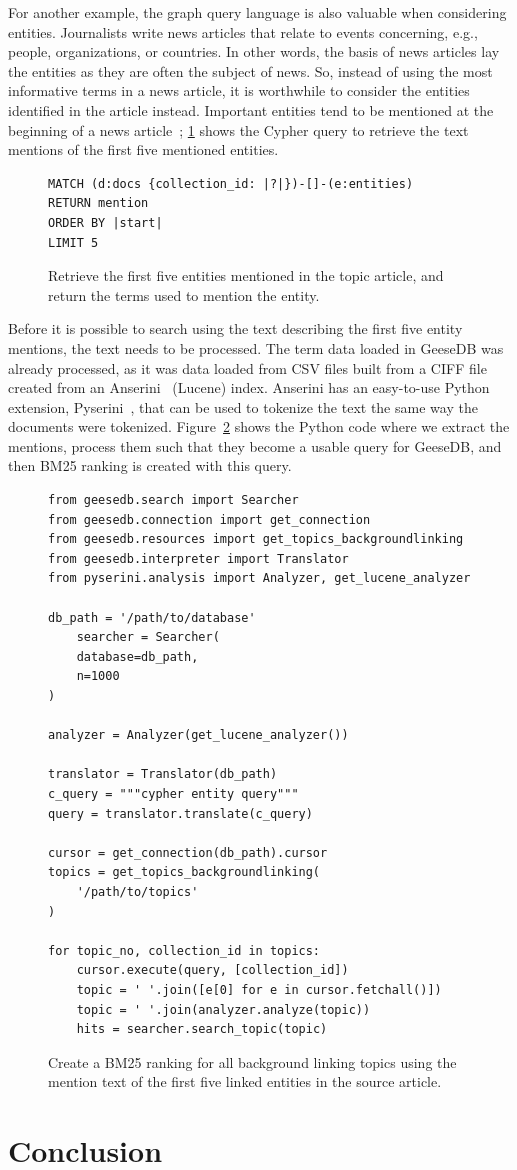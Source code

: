 For another example, the graph query language is also valuable when considering entities. Journalists write news articles that relate to events concerning, e.g., people, organizations, or countries. In other words, the basis of news articles lay the entities as they are often the subject of news. So, instead of using the most informative terms in a news article, it is worthwhile to consider the entities identified in the article instead. Important entities tend to be mentioned at the beginning of a news article~\cite{entities-loc}; \cref{fig:entity-cypher} shows the Cypher query to retrieve the text mentions of the first five mentioned entities.

\begin{figure}
	\begin{verbatim}
MATCH (d:docs {collection_id: |?|})-[]-(e:entities)
RETURN mention
ORDER BY |start|
LIMIT 5
	\end{verbatim}
	\caption{Retrieve the first five entities mentioned in the topic article, and return the terms used to mention the entity.}
	\label{fig:entity-cypher}
\end{figure}
\noindent Before it is possible to search using the text describing the first five entity mentions, the text needs to be processed. The term data loaded in GeeseDB was already processed, as it was data loaded from CSV files built from a CIFF file created from an Anserini~\cite{anserini} (Lucene) index. Anserini has an easy-to-use Python extension, Pyserini~\cite{pyserini}, that can be used to tokenize the text the same way the documents were tokenized. Figure~\ref{fig:entities-code} shows the Python code where we extract the mentions, process them such that they become a usable query for GeeseDB, and then BM25 ranking is created with this query.

\begin{figure}
	\begin{verbatim}
from geesedb.search import Searcher
from geesedb.connection import get_connection
from geesedb.resources import get_topics_backgroundlinking
from geesedb.interpreter import Translator
from pyserini.analysis import Analyzer, get_lucene_analyzer

db_path = '/path/to/database'
    searcher = Searcher(
    database=db_path,
    n=1000
)

analyzer = Analyzer(get_lucene_analyzer())

translator = Translator(db_path)
c_query = """cypher entity query"""
query = translator.translate(c_query)

cursor = get_connection(db_path).cursor
topics = get_topics_backgroundlinking(
    '/path/to/topics'
)

for topic_no, collection_id in topics:
    cursor.execute(query, [collection_id])
    topic = ' '.join([e[0] for e in cursor.fetchall()]) 
    topic = ' '.join(analyzer.analyze(topic))
    hits = searcher.search_topic(topic)
	\end{verbatim}
	\caption{Create a BM25 ranking for all background linking topics using the mention text of the first five linked entities in the source article.}
	\label{fig:entities-code}
\end{figure}

\section{Conclusion}
